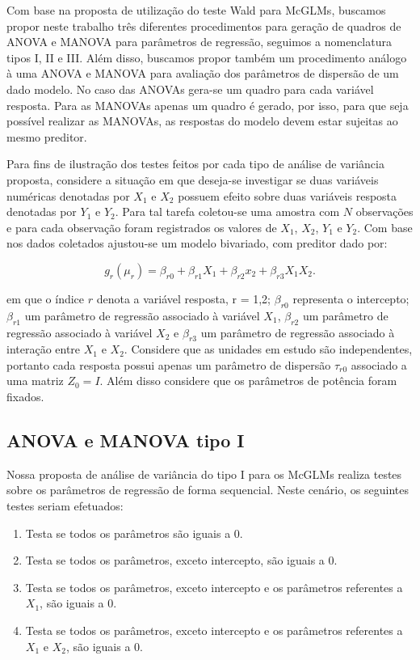 Com base na proposta de utilização do teste Wald para McGLMs, buscamos propor neste trabalho três diferentes procedimentos para geração de quadros de ANOVA e MANOVA para parâmetros de regressão, seguimos a nomenclatura tipos I, II e III. Além disso, buscamos propor também um procedimento análogo à uma ANOVA e MANOVA para avaliação dos parâmetros de dispersão de um dado modelo. No caso das ANOVAs gera-se um quadro para cada variável resposta. Para as MANOVAs apenas um quadro é gerado, por isso, para que seja possível realizar as MANOVAs, as respostas do modelo devem estar sujeitas ao mesmo preditor.

Para fins de ilustração dos testes feitos por cada tipo de análise de variância proposta, considere a situação em que deseja-se investigar se duas variáveis numéricas denotadas por $X_1$ e $X_2$ possuem efeito sobre duas variáveis resposta denotadas por $Y_1$ e $Y_2$. Para tal tarefa coletou-se uma amostra com $N$ observações e para cada observação foram registrados os valores de $X_1$, $X_2$, $Y_1$ e $Y_2$. Com base nos dados coletados ajustou-se um modelo bivariado, com preditor dado por:

$$
g_r(\mu_r) = \beta_{r0} + \beta_{r1} X_1 + \beta_{r2} x_2 + \beta_{r3} X_1X_2.
$$

\noindent em que o índice $r$ denota a variável resposta, r = 1,2; $\beta_{r0}$ representa o intercepto; $\beta_{r1}$ um parâmetro de regressão associado à variável $X_1$, $\beta_{r2}$ um parâmetro de regressão associado à variável $X_2$ e $\beta_{r3}$ um parâmetro de regressão associado à interação entre $X_1$ e $X_2$. Considere que as unidades em estudo são independentes, portanto cada resposta possui apenas um parâmetro de dispersão $\tau_{r0}$ associado a uma matriz $Z_0 = I$. Além disso considere que os parâmetros de potência foram fixados.

\subsection{ANOVA e MANOVA tipo I}

Nossa proposta de análise de variância do tipo I para os McGLMs realiza testes sobre os parâmetros de regressão de forma sequencial. Neste cenário, os seguintes testes seriam efetuados:

\begin{enumerate}
  \item Testa se todos os parâmetros são iguais a 0.
  \item Testa se todos os parâmetros, exceto intercepto, são iguais a 0.
  \item Testa se todos os parâmetros, exceto intercepto e os parâmetros referentes a $X_1$, são iguais a 0.
  \item Testa se todos os parâmetros, exceto intercepto e os parâmetros referentes a $X_1$ e $X_2$, são iguais a 0.
\end{enumerate}

